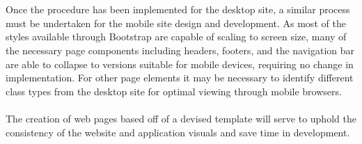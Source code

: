 \documentclass[letterpaper,10pt, draftclsnofoot,onecolumn]{IEEEtran}
\begin{document}
{{{\\ \\
Once the procedure has been implemented for the desktop site, a similar process must be undertaken for the mobile site design and development. As most of the styles available through Bootstrap are capable of scaling to screen size, many of the necessary page components including headers, footers, and the navigation bar are able to collapse to versions suitable for mobile devices, requiring no change in implementation. For other page elements it may be necessary to identify different class types from the desktop site for optimal viewing through mobile browsers.
\\ \\
The creation of web pages based off of a devised template will serve to uphold the consistency of the website and application visuals and save time in development.

}

}}
\end{document}
